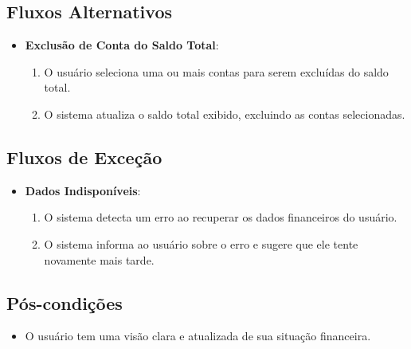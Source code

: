 \subsection*{Fluxos Alternativos}
\begin{addmargin}[1.5cm]{0cm}
	\begin{itemize}
		\item \textbf{Exclusão de Conta do Saldo Total}:
		      \begin{enumerate}
			      \item O usuário seleciona uma ou mais contas para serem excluídas do saldo total.
			      \item O sistema atualiza o saldo total exibido, excluindo as contas selecionadas.
		      \end{enumerate}
	\end{itemize}
\end{addmargin}

\subsection*{Fluxos de Exceção}
\begin{addmargin}[1.5cm]{0cm}
	\begin{itemize}
		\item \textbf{Dados Indisponíveis}:
		      \begin{enumerate}
			      \item O sistema detecta um erro ao recuperar os dados financeiros do usuário.
			      \item O sistema informa ao usuário sobre o erro e sugere que ele tente novamente mais tarde.
		      \end{enumerate}
	\end{itemize}
\end{addmargin}

\subsection*{Pós-condições}
\begin{addmargin}[1.5cm]{0cm}
	\begin{itemize}
		\item O usuário tem uma visão clara e atualizada de sua situação financeira.
	\end{itemize}
\end{addmargin}

